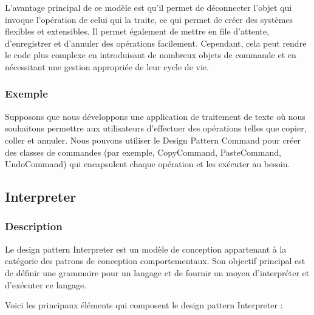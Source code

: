 L'avantage principal de ce modèle est qu'il permet de déconnecter l'objet qui invoque l'opération de celui qui la traite, ce qui permet de créer des systèmes flexibles et extensibles. Il permet également de mettre en file d'attente, d'enregistrer et d'annuler des opérations facilement. Cependant, cela peut rendre le code plus complexe en introduisant de nombreux objets de commande et en nécessitant une gestion appropriée de leur cycle de vie.


\subsubsection{Exemple}

Supposons que nous développons une application de traitement de texte où nous souhaitons permettre aux utilisateurs d'effectuer des opérations telles que copier, coller et annuler. Nous pouvons utiliser le Design Pattern Command pour créer des classes de commandes (par exemple, CopyCommand, PasteCommand, UndoCommand) qui encapsulent chaque opération et les exécuter au besoin.




\newpage

\subsection{Interpreter}

\subsubsection{Description}

Le design pattern Interpreter est un modèle de conception appartenant à la catégorie des patrons de conception comportementaux. Son objectif principal est de définir une grammaire pour un langage et de fournir un moyen d'interpréter et d'exécuter ce langage.

Voici les principaux éléments qui composent le design pattern Interpreter :

